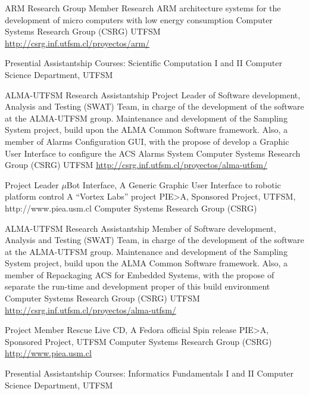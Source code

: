 \documentclass[11pt,a4paper]{moderncv}
\begin{document}
        {ARM Research Group Member}
        {Research ARM architecture systems for the development of micro computers with low energy consumption}
        {Computer Systems Research Group (CSRG)}
        {UTFSM}
        {\url{http://csrg.inf.utfsm.cl/proyectos/arm/}}

        {Presential Assistantship}
        {Courses: Scientific Computation I and II}
        {Computer Science Department, UTFSM}
        {}{}

        {ALMA-UTFSM Research Assistantship}
        {Project Leader of Software development, Analysis and Testing (SWAT) Team, in charge of the development of the software at the ALMA-UTFSM group.
        Maintenance and development of the Sampling System project, build upon the ALMA Common Software framework.
        Also, a member of Alarms Configuration GUI, with the propose of develop a Graphic User Interface to configure the ACS Alarms System}
        {Computer Systems Research Group (CSRG)}
        {UTFSM}
        {\url{http://csrg.inf.utfsm.cl/proyectos/alma-utfsm/}}

        {Project Leader}
        {$\mu$Bot Interface, A Generic Graphic User Interface to robotic platform control}
        {A ``Vortex Labs'' project}
        {PIE>A, Sponsored Project, UTFSM, http://www.piea.usm.cl}
        {Computer Systems Research Group (CSRG)}

        {ALMA-UTFSM Research Assistantship}
        {Member of Software development, Analysis and Testing (SWAT) Team, in charge of the development of the software at the ALMA-UTFSM group.
        Maintenance and development of the Sampling System project, build upon the ALMA Common Software framework.
        Also, a member of Repackaging ACS for Embedded Systems, with the propose of separate the run-time and development
        proper of this build environment}
        {Computer Systems Research Group (CSRG)}
        {UTFSM}
        {\url{http://csrg.inf.utfsm.cl/proyectos/alma-utfsm/}}

        {Project Member}
        {Rescue Live CD, A Fedora official Spin release}
        {PIE>A, Sponsored Project, UTFSM}
        {Computer Systems Research Group (CSRG)}
        {\url{http://www.piea.usm.cl}}

        {Presential Assistantship}
        {Courses: Informatics Fundamentals  I and II}
        {Computer Science Department, UTFSM}
        {}{}
\end{document}
